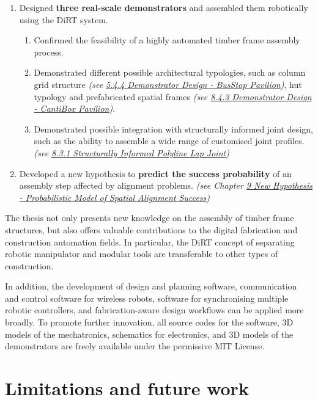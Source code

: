 \begin{enumerate}
	\item Designed \textbf{three real-scale demonstrators} and assembled them robotically using the DiRT system.
	\begin{enumerate}
		\item Confirmed the feasibility of a highly automated timber frame assembly process. 

		\item Demonstrated different possible architectural typologies, such as column grid structure \textit{(see \ul{5.4.4 Demonstrator Design - BusStop Pavilion})}, hut typology  and prefabricated spatial frames \textit{(see \ul{8.4.3 Demonstrator Design  - CantiBox Pavilion})}.

		\item Demonstrated possible integration with structurally informed joint design, such as the ability to assemble a wide range of customised joint profiles. \textit{(see \ul{8.3.1 Structurally Informed Polyline Lap Joint})}
	\end{enumerate}

	\item Developed a new hypothesis to \textbf{predict the success probability} of an assembly step affected by alignment problems. \textit{(see Chapter \ul{9 New Hypothesis - Probabilistic Model of Spatial Alignment Success})}

\end{enumerate}

The thesis not only presents new knowledge on the assembly of timber frame structures, but also offers valuable contributions to the digital fabrication and construction automation fields. In particular, the DiRT concept of separating robotic manipulator and modular tools are transferable to other types of construction. 

In addition, the development of design and planning software, communication and control software for wireless robots, software for synchronising multiple robotic controllers, and fabrication-aware design workflows can be applied more broadly. To promote further innovation, all source codes for the software, 3D models of the mechatronics, schematics for electronics, and 3D models of the demonstrators are freely available under the permissive MIT License. 

\section{Limitations and future work}
\label{section:limitations}

